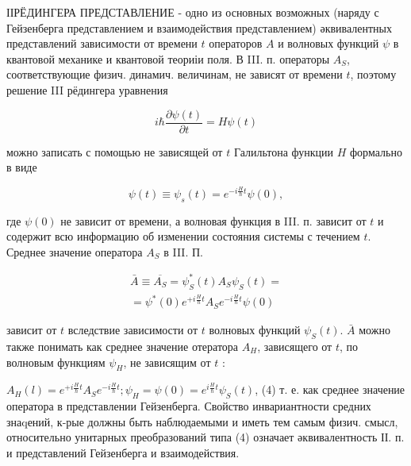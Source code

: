 \documentclass[10pt]{article}
\begin{document}
ІІРЁДИНГЕРА ПРЕДСТАВЛЕНИЕ - одно из основных возможных (наряду с Гейзенберга представлением и взаимодействия представлением) әквивалентных представлений зависимости от времени $t$ операторов $A$ и волновых функций $\psi$ в квантовой механике и квантовой теориіи поля. В III. п. операторы $A_{S}$, соответствующие физич. динамич. величинам, не зависят от времени $t$, поэтому решение III рёдингера уравнения



\[

i \hbar \frac{\partial \psi(t)}{\partial t}=H \psi(t)

\]



можно записать с помощью не зависящей от $t$ Галильтона функции $H$ формально в виде



\[

\psi(t) \equiv \psi_{s}(t)=e^{-i \frac{H}{\hbar} t} \psi(0),

\]



где $\psi(0)$ не зависит от времени, а волновая функция в III. п. зависит от $t$ и содержит всю информацию об изменении состояния системы с течением $t$. Среднее значение оператора $A_{S}$ в III. П.



\[

\begin{gathered}

\bar{A} \equiv \overline{A_{S}}=\psi_{S}^{*}(t) A_{S} \psi_{S}(t)= \\

=\psi^{*}(0) e^{+i \frac{H}{\hbar} t} A_{S} e^{-i \frac{H}{\hbar} t} \psi(0)

\end{gathered}

\]



зависит от $t$ вследствие зависимости от $t$ волновых функций $\psi_{S}(t)$. $\bar{A}$ можно также понимать как среднее значение отератора $A_{H}$, зависящего от $t$, по волновым функциям $\psi_{H}$, не зависящим от $t$ :



$A_{H}(l)=e^{+i \frac{H}{\hbar} t} A_{S} e^{-i \frac{H}{\hbar} t} ; \psi_{H}=\psi(0)=e^{i \frac{H}{\hbar} t} \psi_{S}(t)$, (4) т. е. как среднее значение оператора в представлении Гейзенберга. Свойство инвариантности средних знаqений, к-рые должны быть наблюдаемыми и иметь тем самым физич. смысл, относительно унитарных преобразований типа (4) означает әквивалентность ІІ. п. и представлений Гейзенберга и взаимодействия.
\end{document}
